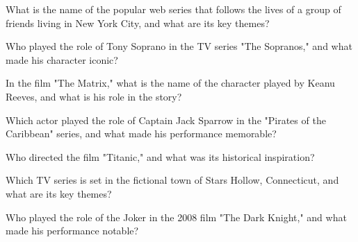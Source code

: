 \documentclass[12pt,a4paper]{book}
\begin{document}
\begin{enhancedmcq}[Question 7]{What is the name of the popular web series that follows the lives of a group of friends living in New York City, and what are its key themes?}
\end{enhancedmcq}

\begin{enhancedmcq}[Question 8]{Who played the role of Tony Soprano in the TV series "The Sopranos," and what made his character iconic?}
\end{enhancedmcq}

\begin{enhancedmcq}[Question 9]{In the film "The Matrix," what is the name of the character played by Keanu Reeves, and what is his role in the story?}
\end{enhancedmcq}

\begin{enhancedmcq}[Question 10]{Which actor played the role of Captain Jack Sparrow in the "Pirates of the Caribbean" series, and what made his performance memorable?}
\end{enhancedmcq}

\begin{enhancedmcq}[Question 11]{Who directed the film "Titanic," and what was its historical inspiration?}
\end{enhancedmcq}

\begin{enhancedmcq}[Question 12]{Which TV series is set in the fictional town of Stars Hollow, Connecticut, and what are its key themes?}
\end{enhancedmcq}

\begin{enhancedmcq}[Question 13]{Who played the role of the Joker in the 2008 film "The Dark Knight," and what made his performance notable?}
\end{enhancedmcq}
\end{document}
